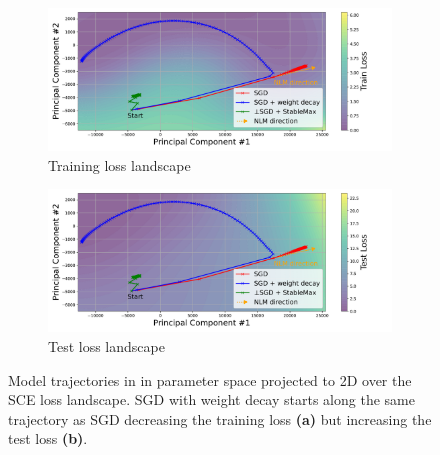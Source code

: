 \begin{figure}[t]
\begin{subfigure}[t]{.48\textwidth}
    \centering
    \includegraphics[width=\linewidth]{grokking_iclr_arxiv/figures/trajectory_with_loss_landscape_train.pdf}
    \caption{Training loss landscape}
    \label{fig:trajectory_plot}
\end{subfigure}
\hfill
\begin{subfigure}[t]{.48\textwidth}
  \centering
  \includegraphics[width=\linewidth]{grokking_iclr_arxiv/figures/trajectory_with_loss_landscape_test.pdf}
  \caption{Test loss landscape}
\end{subfigure}
\vspace{-3mm}
\caption{Model trajectories in in parameter space projected to 2D over the SCE loss landscape. SGD with weight decay starts along the same trajectory as SGD decreasing the training loss \textbf{(a)} but increasing the test loss \textbf{(b)}.\vspace{-6 mm}}
\label{fig:loss_landscape}
\end{figure}

